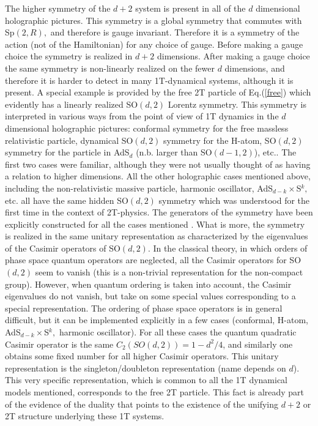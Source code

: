\documentclass[a4paper,12pt]{article}
\begin{document}
The higher symmetry of the $d+2$ system is present in all of the
$d$ dimensional holographic pictures. This symmetry is a global
symmetry that commutes with Sp$\left( 2,R\right) ,$ and therefore
is gauge invariant. Therefore it is a symmetry of the action (not
of the Hamiltonian) for any choice of gauge. Before making a gauge
choice the symmetry is realized in $ d+2$ dimensions. After making
a gauge choice the same symmetry is non-linearly realized on the
fewer $d$ dimensions, and therefore it is harder to detect in many
1T-dynamical systems, although it is present. A special example is
provided by the free 2T particle of Eq.(\ref{free}) which
evidently has a linearly realized SO$\left( d,2\right) $ Lorentz
symmetry. This symmetry is interpreted in various ways from the
point of view of 1T dynamics in the $d$ dimensional holographic
pictures: conformal symmetry for the free massless relativistic
particle, dynamical SO$\left( d,2\right) $ symmetry for the
H-atom, SO$\left( d,2\right) $ symmetry for the particle in
AdS$_{d}$ (n.b. larger than SO$\left( d-1,2\right) $), etc.. The
first two cases were familiar, although they were not usually
thought of as having a relation to higher dimensions. All the
other holographic cases mentioned above, including the
non-relativistic massive particle, harmonic oscillator,
AdS$_{d-k}\times $S$^{k},$ etc. all have the same hidden SO$\left(
d,2\right) $ symmetry which was understood for the first time in
the context of 2T-physics. The generators of the symmetry have
been explicitly constructed for all the cases mentioned
\cite{old2T}. What is more, the symmetry is realized in the same
unitary representation as characterized by the eigenvalues of the
Casimir operators of SO$\left( d,2\right) $. In the classical
theory, in which orders of phase space quantum operators are
neglected, all the Casimir operators for SO$\left( d,2\right) $
seem to vanish (this is a non-trivial representation for the
non-compact group). However, when quantum ordering is taken into
account, the Casimir eigenvalues do not vanish, but take on some
special values corresponding to a special representation. The
ordering of phase space operators is in general difficult, but it
can be implemented explicitly in a few cases (conformal, H-atom,
AdS$_{d-k}\times $S$^{k},$ harmonic oscillator). For all these
cases the quantum quadratic Casimir operator is the same
$C_{2}\left( SO\left( d,2\right) \right) =1-d^{2}/4$, and
similarly one obtains some fixed number for all higher Casimir
operators. This unitary representation is the singleton/doubleton
representation (name depends on $d$). This very specific
representation, which is common to all the 1T dynamical models
mentioned, corresponds to the free 2T particle. This fact is
already part of the evidence of the duality that points to the
existence of the unifying $ d+2 $ or 2T structure underlying these
1T systems.
\end{document}

